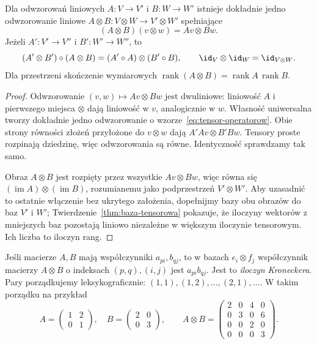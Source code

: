 \begin{twierdzenie}
\label{thm:tensor-operatorow}
Dla odwzorowań liniowych $A\colon V\to V'$ i $B\colon W\to W'$
istnieje dokładnie jedno odwzorowanie liniowe
$A\otimes B\colon V\otimes W\to V'\otimes W'$ spełniające
\begin{equation}\label{eq:tensor-operatorow}
 (A\otimes B)(v\otimes w)=Av\otimes Bw.
\end{equation}
Jeżeli $A'\colon V'\to V''$ i $B'\colon W'\to W''$, to
\[
 (A'\otimes B')\circ(A\otimes B)=(A'\circ A)\otimes(B'\circ B),
 \qquad \id_V\otimes\id_W=\id_{V\otimes W}.
\]
Dla przestrzeni skończenie wymiarowych
$\operatorname{rank}(A\otimes B)=\operatorname{rank}A\,\operatorname{rank}B$.
\end{twierdzenie}
\begin{proof}
Odwzorowanie $(v,w)\mapsto Av\otimes Bw$ jest dwuliniowe:
liniowość $A$ i pierwszego miejsca $\otimes$ dają
liniowość w $v$, analogicznie w $w$. Własność uniwersalna
tworzy dokładnie jedno odwzorowanie o wzorze~\eqref{eq:tensor-operatorow}.
Obie strony równości złożeń przyłożone do $v\otimes w$
dają $A'Av\otimes B'Bw$. Tensory proste rozpinają dziedzinę,
więc odwzorowania są równe. Identyczność sprawdzamy tak samo.

Obraz $A\otimes B$ jest rozpięty przez wszystkie $Av\otimes Bw$,
więc równa się $(\operatorname{im}A)\otimes(\operatorname{im}B)$,
rozumianemu jako podprzestrzeń $V'\otimes W'$.
Aby uzasadnić to ostatnie włączenie bez ukrytego założenia,
dopełnijmy bazy obu obrazów do baz $V'$ i $W'$;
Twierdzenie~\ref{thm:baza-tensorowa} pokazuje, że iloczyny
wektorów z mniejszych baz pozostają liniowo niezależne
w większym iloczynie tensorowym. Ich liczba to iloczyn rang.
\end{proof}

Jeśli macierze $A,B$ mają współczynniki $a_{pi},b_{qj}$,
to w bazach $e_i\otimes f_j$ współczynnik macierzy
$A\otimes B$ o indeksach $(p,q),(i,j)$ jest $a_{pi}b_{qj}$.
Jest to \emph{iloczyn Kroneckera}. Pary porządkujemy
leksykograficznie: $(1,1),(1,2),\ldots,(2,1),\ldots$.
W takim porządku na przykład
\[
 A=\begin{pmatrix}1&2\\0&1\end{pmatrix},\quad
 B=\begin{pmatrix}2&0\\0&3\end{pmatrix},\qquad
 A\otimes B=
 \begin{pmatrix}
 2&0&4&0\\0&3&0&6\\0&0&2&0\\0&0&0&3
 \end{pmatrix}.
\]

